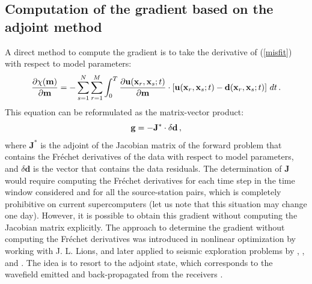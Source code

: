 \subsection{Computation of the gradient based on the adjoint method}

A direct method to compute the gradient is to take the derivative of (\ref{misfit}) with respect to model parameters:
\begin{equation}
\frac{\partial\chi(\mathbf{m})}{\partial\mathbf{m}} = -\sum_{s=1}^N\sum_{r=1}^M \int_0^T
\frac{\partial \mathbf{u}(\mathbf{x}_r, \mathbf{x}_s; t)}{\partial\mathbf{m}}\cdot\left[\mathbf{u}(\mathbf{x}_r, \mathbf{x}_s; t) - \mathbf{d}(\mathbf{x}_r, \mathbf{x}_s; t)\right] \, dt \, .
\label{calc_gradient}
\end{equation}
This equation can be reformulated as the matrix-vector product:
\begin{equation}
\mathbf{g} = -\mathbf{J}^* \cdot \delta \mathbf{d} \, ,
\label{Jacobian}
\end{equation}
where $\mathbf{J}^*$ is the adjoint of the Jacobian matrix of the forward problem that contains the Fr\'echet derivatives of the
data with respect to model parameters, and $\delta \mathbf{d}$ is the vector that contains the data residuals.
The determination of $\mathbf{J}$ would require computing the Fr\'echet derivatives for each time step in the time
window considered and for all the source-station pairs, which is completely prohibitive on current supercomputers
(let us note that this situation may change one day).
However, it is possible to obtain this gradient without computing the Jacobian matrix explicitly.
The approach to determine the gradient without computing the Fr\'echet derivatives was introduced in nonlinear optimization
by \cite{Cha74} working with J. L. Lions, and later applied to seismic exploration problems by
\cite{BaChLa77}, \cite{BaChHeLa82}, \cite{Lai83} and \cite{Tar84}. The idea is to resort to the adjoint state,
which corresponds to the wavefield emitted and back-propagated from the receivers \cite[e.g.,][]{TrTaLi05,TrKoLi08,Plessix_2006_RAS,FiBuIg06}.\newline



